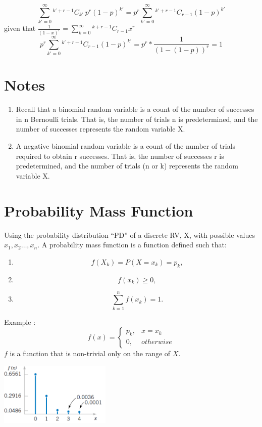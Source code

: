 \documentclass[12pt]{article}
\theoremstyle{definition}
\newcommand*{\Comb}[2]{{}^{#1}C_{#2}}%
\begin{document}
\begin{equation}
    \displaystyle \sum_{k' = 0}^{\infty} \Comb{k' + r -1}{k'} \ p^r (1-p)^{k'} =
    p^r \sum_{k'= 0}^{\infty}  \Comb{k' + r-1}{r-1}(1-p)^{k'}
\end{equation}
given that $ \displaystyle \frac{1}{(1-x)^r} = \sum_{k=0}^{\infty} \Comb{k+r-1}{r-1}x^r $
\begin{equation}
    \displaystyle p^r \sum_{k'= 0}^{\infty}  \Comb{k' + r-1}{r-1}(1-p)^{k'} = p^r * \frac{1}{(1-(1-p))^r} = 1 
\end{equation}
\section{Notes}
\begin{enumerate}
    \item Recall that a binomial random variable is a count of the number
    of successes in n Bernoulli trials. That is, the number of trials n is
    predetermined, and the number of successes represents the random variable X.
    \item  A negative binomial random variable is a count of the number of
trials required to obtain r successes. That is, the number of
successes r is predetermined, and the number of trials (n or k)
represents the random variable X.
\end{enumerate}    

\section{Probability Mass Function}
Using the probability distribution “PD” of a discrete RV,
X, with possible values $x_1, x_2\dots, x_n.$ A probability mass function is a function defined such that:
\begin{enumerate}
    \item \[    f(X_k) = P(X = x_k) = p_k,  \]
    \item \[          f(x_k) \geq 0,  \]
    \item \[  \displaystyle \sum_{k=1}^{n} f(x_k) = 1.       \]
\end{enumerate}
Example :\[ f(x)= \begin{cases} 
      p_k, & x=x_k \\
      0, & otherwise
   \end{cases}
\] $f$ is a function that is non-trivial only on the range of $X$.

\begin{center}
    \includegraphics[width=201px]{2.png}
\end{center}
\end{document}
